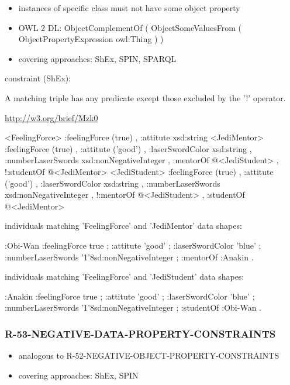 \documentclass{llncs}
\begin{document}
\begin{itemize}
	\item instances of specific class must not have some object property
  \item OWL 2 DL: ObjectComplementOf ( ObjectSomeValuesFrom ( ObjectPropertyExpression owl:Thing ) )
	\item covering approaches: ShEx, SPIN, SPARQL
\end{itemize}

constraint (ShEx):

A matching triple has any predicate except those excluded by the '!' operator.

\url{http://w3.org/brief/Mzk0}

\begin{ex}
<FeelingForce> {
    :feelingForce (true) ,
    :attitute xsd:string }
<JediMentor> {
    :feelingForce (true) ,
    :attitute ('good') ,
    :laserSwordColor xsd:string ,
    :numberLaserSwords xsd:nonNegativeInteger ,
    :mentorOf @<JediStudent> ,
   !:studentOf @<JediMentor> }
<JediStudent> {
    :feelingForce (true) ,
    :attitute ('good') ,
    :laserSwordColor xsd:string ,
    :numberLaserSwords xsd:nonNegativeInteger ,
   !:mentorOf @<JediStudent> ,
    :studentOf @<JediMentor> }
\end{ex}

individuals matching 'FeelingForce' and 'JediMentor' data shapes:

\begin{ex}
:Obi-Wan 
    :feelingForce true ;
    :attitute 'good' ;
    :laserSwordColor 'blue' ;
    :numberLaserSwords '1'^^xsd:nonNegativeInteger ;
    :mentorOf :Anakin .
\end{ex}

individuals matching 'FeelingForce' and 'JediStudent' data shapes:

\begin{ex}
:Anakin 
    :feelingForce true ;
    :attitute 'good' ;
    :laserSwordColor 'blue' ;
    :numberLaserSwords '1'^^xsd:nonNegativeInteger ;
    :studentOf :Obi-Wan .
\end{ex}

\subsubsection{R-53-NEGATIVE-DATA-PROPERTY-CONSTRAINTS}

\begin{itemize}
	\item analogous to R-52-NEGATIVE-OBJECT-PROPERTY-CONSTRAINTS
	\item covering approaches: ShEx, SPIN
\end{itemize}
\end{document}
